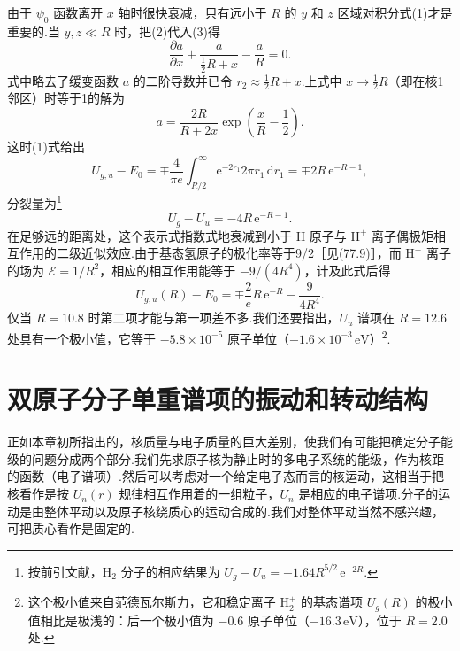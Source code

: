 \begin{xiti}
由于 $\psi_0$ 函数离开 $x$ 轴时很快衰减，只有远小于 $R$ 的 $y$ 和 $z$ 区域对积分式(1)才是重要的.当 $y,z\ll R$ 时，把(2)代入(3)得
\begin{equation*}
  \frac{\partial a}{\partial x}+\frac{a}{\frac{1}{2}R+x}-\frac{a}{R}=0.
\end{equation*}
式中略去了缓变函数 $a$ 的二阶导数并已令 $r_2\approx\frac{1}{2}R+x$.上式中 $x\to\frac{1}{2}R$（即在核1邻区）时等于1的解为
\begin{equation*}
  a=\frac{2R}{R+2x}\exp\left(\frac{x}{R}-\frac{1}{2}\right).
\end{equation*}
这时(1)式给出
\begin{equation*}
  U_{g,u}-E_0=\mp\frac{4}{\pi e}\int_{R/2}^{\infty}\mathrm{e}^{-2r_1}2\pi r_1\,\mathrm{d}r_1
  =\mp2R\,\mathrm{e}^{-R-1},
\end{equation*}
分裂量为\footnote{按前引文献，$\mathrm{H}_2$ 分子的相应结果为 $U_g-U_u=-1.64R^{5/2}\,\mathrm{e}^{-2R}$.}
\begin{equation}
  U_g-U_u=-4R\,\mathrm{e}^{-R-1}.
\end{equation}
在足够远的距离处，这个表示式指数式地衰减到小于 H 原子与 $\mathrm{H}^+$ 离子偶极矩相互作用的二级近似效应.由于基态氢原子的极化率等于9/2［见(77.9)］，而 $\mathrm{H}^+$ 离子的场为 $\mathcal{E}=1/R^2$，相应的相互作用能等于 $-9/(4R^4)$，计及此式后得
\begin{equation}
  U_{g,u}(R)-E_0=\mp\frac{2}{e}R\,\mathrm{e}^{-R}-\frac{9}{4R^4}.
\end{equation}
仅当 $R=10.8$ 时第二项才能与第一项差不多.我们还要指出，$U_u$ 谱项在 $R=12.6$ 处具有一个极小值，它等于 $-5.8\times10^{-5}$ 原子单位（$-1.6\times10^{-3}\,\mathrm{eV}$）\footnote{这个极小值来自范德瓦尔斯力，它和稳定离子 $\mathrm{H}_2^+$ 的基态谱项 $U_g(R)$ 的极小值相比是极浅的：后一个极小值为 $-0.6$ 原子单位（$-16.3\,\mathrm{eV}$），位于 $R=2.0$ 处.}.

\end{xiti}
\renewcommand{\theequation}{\arabic{section}.\arabic{equation}}%

\section{双原子分子单重谱项的振动和转动结构}

正如本章初所指出的，核质量与电子质量的巨大差别，使我们有可能把确定分子能级的问题分成两个部分.我们先求原子核为静止时的多电子系统的能级，作为核距的函数（电子谱项）.然后可以考虑对一个给定电子态而言的核运动，这相当于把核看作是按 $U_n(r)$ 规律相互作用着的一组粒子，$U_n$ 是相应的电子谱项.分子的运动是由整体平动以及原子核绕质心的运动合成的.我们对整体平动当然不感兴趣，可把质心看作是固定的.

